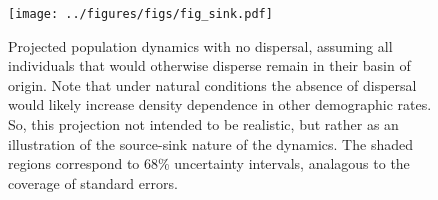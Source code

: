 \documentclass[11pt]{article}
\begin{document}
\clearpage
\begin{figure}
\centering
\texttt{[image: ../figures/figs/fig\_sink.pdf]}
\caption{\label{fig:sink}
Projected population dynamics with no dispersal,
assuming all individuals that would otherwise disperse remain 
in their basin of origin.
Note that under natural conditions the absence of dispersal 
would likely increase density dependence in other demographic rates.
So, this projection not intended to be realistic, 
but rather as an illustration of the source-sink nature of the dynamics.
The shaded regions correspond to 68\% uncertainty intervals,
analagous to the coverage of standard errors.
}
\end{figure}
\clearpage

\renewcommand{\thefigure}{A\arabic{figure}}
\renewcommand{\theequation}{A\arabic{equation}}
\renewcommand{\thetable}{A\arabic{table}}
\setcounter{equation}{0}
\setcounter{figure}{0}
\setcounter{table}{0}


\end{document}
